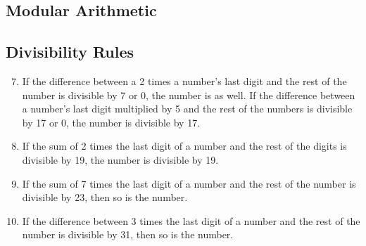 \documentclass[./Discrete Math.tex]{subfiles}
\begin{document}
		\subsection{Modular Arithmetic}
		\subsection*{Divisibility Rules}
			\begin{enumerate}
				\setcounter{enumi}{6}
				\item
					If the difference between a 2 times a number's last digit and the rest of the number is divisible by 7 or 0, the number is as well.
				\setcounter{enumi}{17}
					If the difference between a number's last digit multiplied by 5 and the rest of the numbers is divisible by 17 or 0, the number is divisible by 17.
				\setcounter{enumi}{18}
				\item
					If the sum of 2 times the last digit of a number and the rest of the digits is divisible by 19, the number is divisible by 19.
				\setcounter{enumi}{22}
				\item
					If the sum of 7 times the last digit of a number and the rest of the number is divisible by 23, then so is the number.
				\setcounter{enumi}{30}
				\item
					If the difference between 3 times the last digit of a number and the rest of the number is divisible by 31, then so is the number.
			\end{enumerate}
\end{document}
